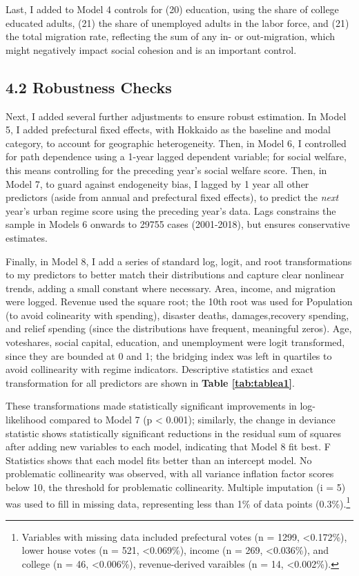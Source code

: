 \documentclass[preprint, 3p,
authoryear]{elsarticle} %
\begin{document}
Last, I added to Model 4 controls for (20) education, using the share of
college educated adults, (21) the share of unemployed adults in the
labor force, and (21) the total migration rate, reflecting the sum of
any in- or out-migration, which might negatively impact social cohesion
and is an important control.

\hypertarget{robustness-checks}{%
\subsection{4.2 Robustness Checks}\label{robustness-checks}}

Next, I added several further adjustments to ensure robust estimation.
In Model 5, I added prefectural fixed effects, with Hokkaido as the
baseline and modal category, to account for geographic heterogeneity.
Then, in Model 6, I controlled for path dependence using a 1-year lagged
dependent variable; for social welfare, this means controlling for the
preceding year's social welfare score. Then, in Model 7, to guard
against endogeneity bias, I lagged by 1 year all other predictors (aside
from annual and prefectural fixed effects), to predict the \emph{next}
year's urban regime score using the preceding year's data. Lags
constrains the sample in Models 6 onwards to 29755 cases (2001-2018),
but ensures conservative estimates.

Finally, in Model 8, I add a series of standard log, logit, and root
transformations to my predictors to better match their distributions and
capture clear nonlinear trends, adding a small constant where necessary.
Area, income, and migration were logged. Revenue used the square root;
the 10th root was used for Population (to avoid colinearity with
spending), disaster deaths, damages,recovery spending, and relief
spending (since the distributions have frequent, meaningful zeros). Age,
voteshares, social capital, education, and unemployment were logit
transformed, since they are bounded at 0 and 1; the bridging index was
left in quartiles to avoid collinearity with regime indicators.
Descriptive statistics and exact transformation for all predictors are
shown in \textbf{Table \ref{tab:tablea1}}.

These transformations made statistically significant improvements in
log-likelihood compared to Model 7 (p \textless{} 0.001); similarly, the
change in deviance statistic shows statistically significant reductions
in the residual sum of squares after adding new variables to each model,
indicating that Model 8 fit best. F Statistics shows that each model
fits better than an intercept model. No problematic collinearity was
observed, with all variance inflation factor scores below 10, the
threshold for problematic collinearity. Multiple imputation (i = 5) was
used to fill in missing data, representing less than 1\% of data points
(0.3\%).\footnote{Variables with missing data included prefectural votes
  (n = 1299, \textless0.172\%), lower house votes (n = 521,
  \textless0.069\%), income (n = 269, \textless0.036\%), and college (n
  = 46, \textless0.006\%), revenue-derived varaibles (n = 14,
  \textless0.002\%).}
\end{document}
